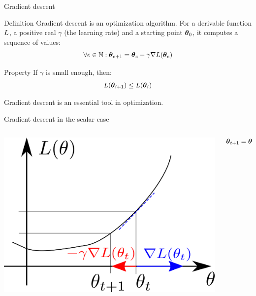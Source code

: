 \documentclass[xcolor=pdftex,dvipsnames,table,mathserif]{beamer}
\begin{document}
\begin{frame}{Gradient descent}

\begin{block}{Definition}
  Gradient descent is an optimization algorithm. For a derivable function $L$, a positive real $\gamma$ (the \alert{learning rate}) and a starting point $\boldsymbol{\theta}_0$, it computes a sequence of values:
  \[
  \forall e \in \mathbb{N}: \boldsymbol{\theta}_{e+1} = \boldsymbol{\theta}_e - \gamma \nabla L(\boldsymbol{\theta}_e)
  \]
\end{block}

\begin{block}{Property}
  If $\gamma$ is small enough, then:
  \[
  L(\boldsymbol{\theta}_{i+1}) \leq L(\boldsymbol{\theta}_i)
  \]
\end{block}

Gradient descent is an essential tool in optimization.

\end{frame}

\begin{frame}{Gradient descent in the scalar case}

\begin{columns}
  \begin{column}{.5\textwidth}
    \includegraphics[width=\textwidth]{gradient_descent}
  \end{column}

  \begin{column}{.5\textwidth}
    \[
    \boldsymbol{\theta}_{t+1} = \boldsymbol{\theta}_t - \gamma\nabla L(\boldsymbol{\theta}_t)
    \]
  \end{column}
\end{columns}

\end{frame}
\end{document}
